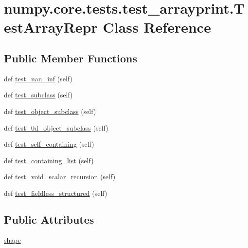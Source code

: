 \hypertarget{classnumpy_1_1core_1_1tests_1_1test__arrayprint_1_1TestArrayRepr}{}\section{numpy.\+core.\+tests.\+test\+\_\+arrayprint.\+Test\+Array\+Repr Class Reference}
\label{classnumpy_1_1core_1_1tests_1_1test__arrayprint_1_1TestArrayRepr}
\subsection*{Public Member Functions}
\begin{DoxyCompactItemize}
\item 
def \hyperlink{classnumpy_1_1core_1_1tests_1_1test__arrayprint_1_1TestArrayRepr_a5756d63bdaba3f0976a581d49eb5aa2b}{test\+\_\+nan\+\_\+inf} (self)
\item 
def \hyperlink{classnumpy_1_1core_1_1tests_1_1test__arrayprint_1_1TestArrayRepr_af60cba706e7d7957f2dc3627a00c490e}{test\+\_\+subclass} (self)
\item 
def \hyperlink{classnumpy_1_1core_1_1tests_1_1test__arrayprint_1_1TestArrayRepr_abb8c5c21733c6bd8603cf1502d198ad4}{test\+\_\+object\+\_\+subclass} (self)
\item 
def \hyperlink{classnumpy_1_1core_1_1tests_1_1test__arrayprint_1_1TestArrayRepr_ab853d42beb54a8d925772f6c38bcf50e}{test\+\_\+0d\+\_\+object\+\_\+subclass} (self)
\item 
def \hyperlink{classnumpy_1_1core_1_1tests_1_1test__arrayprint_1_1TestArrayRepr_aa5610a7281a8e1d746b19df0ad1993c2}{test\+\_\+self\+\_\+containing} (self)
\item 
def \hyperlink{classnumpy_1_1core_1_1tests_1_1test__arrayprint_1_1TestArrayRepr_a89aec0dc390138354ddd4db05ce4b503}{test\+\_\+containing\+\_\+list} (self)
\item 
def \hyperlink{classnumpy_1_1core_1_1tests_1_1test__arrayprint_1_1TestArrayRepr_aae21de57fd7471bc5fd947a42b69ef4d}{test\+\_\+void\+\_\+scalar\+\_\+recursion} (self)
\item 
def \hyperlink{classnumpy_1_1core_1_1tests_1_1test__arrayprint_1_1TestArrayRepr_ad8fc4c971d7ec66fd5c9bb316d84d814}{test\+\_\+fieldless\+\_\+structured} (self)
\end{DoxyCompactItemize}
\subsection*{Public Attributes}
\begin{DoxyCompactItemize}
\item 
\hyperlink{classnumpy_1_1core_1_1tests_1_1test__arrayprint_1_1TestArrayRepr_a648d206ee0e05706a9f19a90577071c7}{shape}
\end{DoxyCompactItemize}
